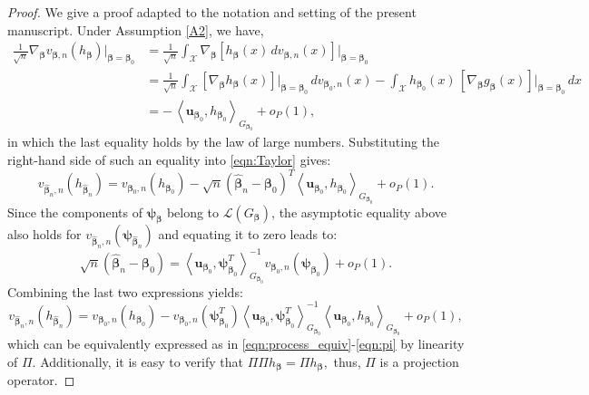 \documentclass[11pt]{article}
\newcommand{\vect}[1]{\boldsymbol{#1}}
\newcommand{\inner}[1]{\left\langle #1 \right\rangle}
\begin{document}
\begin{proof}
We give a proof adapted to the notation and setting of the present manuscript.
Under Assumption \ref{A2}, we have,
\begin{equation}
\begin{aligned}
\frac{1}{\sqrt{n}}
\nabla_{\vect{\beta}} v_{\vect{\beta},n}(h_{\vect{\beta}})
\Big|_{\vect{\beta}=\vect{\beta}_0}
&=
\frac{1}{\sqrt{n}}
\int_{\mathcal{X}}
\nabla_{\vect{\beta}}
\!\left[
h_{\vect{\beta}}(x)\, dv_{\vect{\beta},n}(x)
\right]
\Big|_{\vect{\beta}=\vect{\beta}_0}
\\[0.4em]
&=
\frac{1}{\sqrt{n}}
\int_{\mathcal{X}}
\left[
\nabla_{\vect{\beta}} h_{\vect{\beta}}(x)
\right]\Big|_{\vect{\beta}=\vect{\beta}_0}
\, dv_{\vect{\beta}_0,n}(x)
-
\int_{\mathcal{X}}
h_{\vect{\beta}_0}(x)\,
\left[
\nabla_{\vect{\beta}} g_{\vect{\beta}}(x)
\right]\Big|_{\vect{\beta}=\vect{\beta}_0}
\, dx
\\[0.4em]
&=
-\,
\inner{
\vect{u}_{\vect{\beta}_0},
h_{\vect{\beta}_0}
}_{G_{\vect{\beta}_0}}
+ o_P(1),
\end{aligned}
\label{eqn:gred}
\end{equation}
in which the last equality holds by the law of large numbers. 
Substituting the right-hand side of such an equality into \eqref{eqn:Taylor} gives:
$$v_{\widehat{\vect{\beta}}_n,n}(h_{\widehat{\vect{\beta}}_n}) = v_{\vect{\beta}_0,n}(h_{\vect{\beta}_0}) - \sqrt{n}(\widehat{\vect{\beta}}_n- \vect{\beta}_0)^T \inner{\vect{u}_{\vect{\beta}_0},h_{\vect{\beta}_0}}_{G_{\vect{\beta}_0}}
+o_P(1).$$
Since  the components of $\vect{\psi}_{{\vect{\beta}}}$ belong to $\mathcal{L}\left(G_{\vect{\beta}}\right)$, the asymptotic equality above also holds for $v_{\widehat{\vect{\beta}}_n,n}( \vect{\psi}_{\widehat{\vect{\beta}}_n})$ and equating it to zero leads to:
$$\sqrt{n}(\widehat{\vect{\beta}}_n- \vect{\beta}_0) =  \inner{\vect{u}_{\vect{\beta}_0},\vect{\psi}^T_{\vect{\beta}_0}}^{-1}_{G_{\vect{\beta}_0}}v_{\vect{\beta}_0,n}(\vect{\psi}_{\vect{\beta}_0})
+o_P(1).$$
Combining the last two expressions yields:
$$v_{\widehat{\vect{\beta}}_n,n}(h_{\widehat{\vect{\beta}}_n}) = v_{\vect{\beta}_0,n}(h_{\vect{\beta}_0}) -  v_{\vect{\beta}_0,n}(\vect{\psi}^T_{\vect{\beta}_0})\inner{\vect{u}_{\vect{\beta}_0},\vect{\psi}^T_{\vect{\beta}_0}}^{-1}_{G_{\vect{\beta}_0}}\inner{\vect{u}_{\vect{\beta}_0},h_{\vect{\beta}_0}}_{G_{\vect{\beta}_0}}
+o_P(1),$$
which can be equivalently expressed as in \eqref{eqn:process_equiv}-\eqref{eqn:pi} by linearity of  $\Pi$.
Additionally, it is easy to verify that
$\Pi \Pi h_{\vect{\beta}} = \Pi h_{\vect{\beta}},$
thus, $\Pi$ is a projection operator.
\end{proof}
\end{document}

